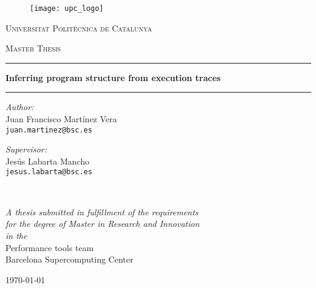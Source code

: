 \documentclass[a4paper,11pt,twoside]{book}
\begin{document}
\frontmatter 
\pagestyle{plain} 


\begin{titlepage}
\begin{center}

\begin{figure}[h]
  \centering
  \texttt{[image: upc\_logo]}
  \label{}
\end{figure}

\vspace*{.02\textheight}
{\scshape\LARGE Universitat Polit\`ecnica de Catalunya\par}\vspace{1.5cm} %
\textsc{\Large Master Thesis}
\vspace{1.5cm}
\hrule
\vspace{0.4cm}
{\huge \bfseries Inferring program structure from execution traces\par}
\vspace{0.4cm}
\hrule
\vspace{1.5cm}
 
\begin{minipage}[t]{0.4\textwidth}
\begin{flushleft} \large
\emph{Author:}\\
Juan Francisco Mart\'inez Vera \\
{\tt juan.martinez@bsc.es} %
\end{flushleft}
\end{minipage}
\begin{minipage}[t]{0.4\textwidth}
\begin{flushright} \large
\emph{Supervisor:} \\
Jes\'us Labarta Mancho\\
{\tt jesus.labarta@bsc.es} %
\end{flushright}
\end{minipage}\\[3cm]
 
\vfill

\large \textit{A thesis submitted in fulfillment of the requirements\\ for the
degree of Master in Research and Innovation}\\[0.3cm] %
\textit{in the}\\[0.4cm]
Performance tools team\\Barcelona Supercomputing Center\\[2cm] %
 
\vfill

{\large \today}\\[4cm] %
 
\vfill
\end{center}
\end{titlepage}
\end{document}
